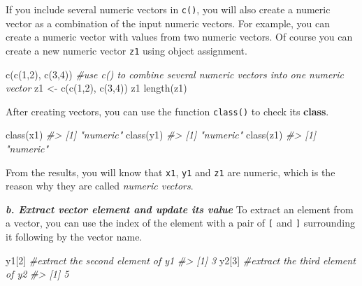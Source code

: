 \documentclass[
]{book}
\newenvironment{Shaded}{\begin{snugshade}}{\end{snugshade}}
\newcommand{\CommentTok}[1]{\textcolor[rgb]{0.56,0.35,0.01}{\textit{#1}}}
\newcommand{\DecValTok}[1]{\textcolor[rgb]{0.00,0.00,0.81}{#1}}
\newcommand{\FunctionTok}[1]{\textcolor[rgb]{0.00,0.00,0.00}{#1}}
\newcommand{\NormalTok}[1]{#1}
\newcommand{\OtherTok}[1]{\textcolor[rgb]{0.56,0.35,0.01}{#1}}
\begin{document}
If you include several numeric vectors in \texttt{c()}, you will also create a numeric vector as a combination of the input numeric vectors. For example, you can create a numeric vector with values from two numeric vectors. Of course you can create a new numeric vector \texttt{z1} using object assignment.

\begin{Shaded}
\begin{Highlighting}[]
\FunctionTok{c}\NormalTok{(}\FunctionTok{c}\NormalTok{(}\DecValTok{1}\NormalTok{,}\DecValTok{2}\NormalTok{), }\FunctionTok{c}\NormalTok{(}\DecValTok{3}\NormalTok{,}\DecValTok{4}\NormalTok{))          }\CommentTok{\#use c() to combine several numeric vectors into one numeric vector}
\NormalTok{z1 }\OtherTok{\textless{}{-}} \FunctionTok{c}\NormalTok{(}\FunctionTok{c}\NormalTok{(}\DecValTok{1}\NormalTok{,}\DecValTok{2}\NormalTok{), }\FunctionTok{c}\NormalTok{(}\DecValTok{3}\NormalTok{,}\DecValTok{4}\NormalTok{))}
\NormalTok{z1}
\FunctionTok{length}\NormalTok{(z1)}
\end{Highlighting}
\end{Shaded}

After creating vectors, you can use the function \texttt{class()} to check its \textbf{class}.

\begin{Shaded}
\begin{Highlighting}[]
\FunctionTok{class}\NormalTok{(x1)}
\CommentTok{\#\textgreater{} [1] "numeric"}
\FunctionTok{class}\NormalTok{(y1)}
\CommentTok{\#\textgreater{} [1] "numeric"}
\FunctionTok{class}\NormalTok{(z1)}
\CommentTok{\#\textgreater{} [1] "numeric"}
\end{Highlighting}
\end{Shaded}

From the results, you will know that \texttt{x1}, \texttt{y1} and \texttt{z1} are numeric, which is the reason why they are called \emph{numeric vectors}.

\textbf{\emph{b. Extract vector element and update its value}}
To extract an element from a vector, you can use the index of the element with a pair of \texttt{{[}} and \texttt{{]}} surrounding it following by the vector name.

\begin{Shaded}
\begin{Highlighting}[]
\NormalTok{y1[}\DecValTok{2}\NormalTok{]     }\CommentTok{\#extract the second element of \textasciigrave{}y1\textasciigrave{}}
\CommentTok{\#\textgreater{} [1] 3}
\NormalTok{y2[}\DecValTok{3}\NormalTok{]     }\CommentTok{\#extract the third element of \textasciigrave{}y2\textasciigrave{}}
\CommentTok{\#\textgreater{} [1] 5}
\end{Highlighting}
\end{Shaded}
\end{document}

